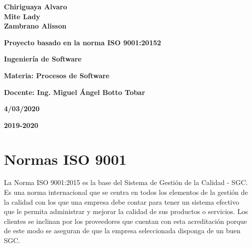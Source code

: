 \documentclass[12pt,a4paper]{article}
\begin{document}
{\begin{center}
{\par\vspace{0.2cm}
\Large\textbf{Chiriguaya Alvaro}\\
\Large\textbf{Mite Lady} \\
\Large\textbf{Zambrano Alisson}\\
\par\vspace{0.5cm}
\Large\textbf{Proyecto basado en la norma ISO 9001:20152}
\par\vspace{1cm}
\Large\textbf{Ingenier\'ia de Software}
\par\vspace{1cm}
\Large\textbf{Materia: Procesos de Software}
\par\vspace{1cm}
\Large\textbf{Docente: Ing. Miguel \'Angel Botto Tobar }
}
\par\vspace{2cm}
\large\textbf{ 4/03/2020}
\par\vspace{0.5cm}
\large\textbf{2019-2020} 
\par\vspace{3cm} 

\end{center}
\clearpage
}

\tableofcontents
\par\vspace{12cm}

\section{Normas ISO 9001}\textbf{}
La Norma ISO 9001:2015 es la base del Sistema de Gestión de la Calidad - SGC. Es una norma internacional que se centra en todos los elementos de la gestión de la calidad con los que una empresa debe contar para tener un sistema efectivo que le permita administrar y mejorar la calidad de sus productos o servicios. 
Los clientes se inclinan por los proveedores que cuentan con esta acreditación porque de este modo se aseguran de que la empresa seleccionada disponga de un buen SGC.
\end{document}
